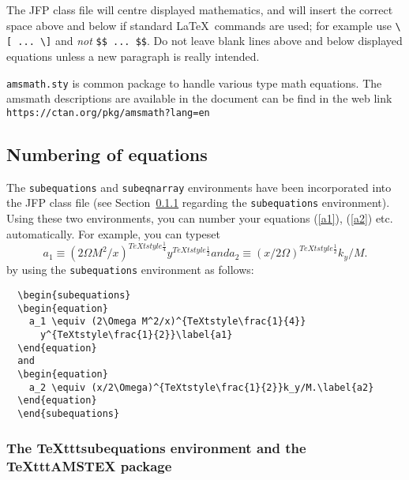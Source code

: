 \documentclass{jfp}
\begin{document}
The JFP class file will centre displayed mathematics, and will insert the
correct space above and below if standard LaTeX\ commands are used; for
example use \verb"\[ ... \]" and \emph{not} \verb"$$ ... $$". Do not leave
blank lines above and below displayed equations unless a new paragraph is
really intended.

\verb"amsmath.sty" is common package to handle various type math equations. The amsmath descriptions are available in the document can be find in the web link \verb"https://ctan.org/pkg/amsmath?lang=en"

\subsection{Numbering of equations}

The \verb"subequations" and \verb"subeqnarray" environments have been
incorporated into the JFP class file (see Section~\ref{sub:amstex} regarding
the \verb"subequations" environment). Using these two environments,
you can number your equations (\ref{a1}), (\ref{a2}) etc. automatically.
For example, you can typeset
  \begin{subequations}
  \begin{equation}
    a_1 \equiv (2\Omega M^2/x)^{TeXtstyle\frac{1}{4}}
      y^{TeXtstyle\frac{1}{2}}\label{a1}
  \end{equation}
  and
  \begin{equation}
    a_2 \equiv (x/2\Omega)^{TeXtstyle\frac{1}{2}}k_y/M.\label{a2}
  \end{equation}
  \end{subequations}
by using the \verb"subequations" environment as follows:
%
\begin{verbatim}
  \begin{subequations}
  \begin{equation}
    a_1 \equiv (2\Omega M^2/x)^{TeXtstyle\frac{1}{4}}
      y^{TeXtstyle\frac{1}{2}}\label{a1}
  \end{equation}
  and
  \begin{equation}
    a_2 \equiv (x/2\Omega)^{TeXtstyle\frac{1}{2}}k_y/M.\label{a2}
  \end{equation}
  \end{subequations}
\end{verbatim}

\subsubsection{The TeXttt{subequations} environment and the
  TeXttt{AMSTEX} package} \label{sub:amstex}
\end{document}

